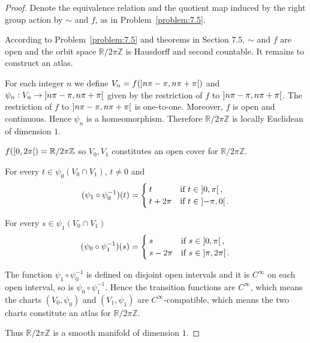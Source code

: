 \begin{proof}
    Denote the equivalence relation and the quotient map induced by the right group action by \( \sim \) and \( f \), as in Problem~\ref{problem:7.5}.

    According to Problem~\ref{problem:7.5} and theorems in Section 7.5, \( \sim \) and \( f \) are open and the orbit space \( \mathbb{R}/2\pi\mathbb{Z} \) is Hausdorff and second countable. It remains to construct an atlas.

    For each integer \(n\) we define \( V_{n} = f(\left\rbrack{n\pi - \pi, n\pi + \pi}\right\lbrack) \) and \( \psi_{n}: V_{n} \to \left\rbrack{n\pi - \pi, n\pi + \pi}\right\lbrack \) given by the restriction of \( f \) to \( \left\rbrack{n\pi - \pi, n\pi + \pi}\right\lbrack \). The restriction of \( f \) to \( \left\rbrack{n\pi - \pi, n\pi + \pi}\right\lbrack \) is one-to-one. Moreover, \( f \) is open and continuous. Hence \( \psi_{n} \) is a homeomorphism. Therefore \( \mathbb{R}/2\pi\mathbb{Z} \) is locally Euclidean of dimension \(1\).

    \( f(\left\lbrack{0, 2\pi}\right\lbrack) = \mathbb{R}/2\pi\mathbb{Z} \) so \( V_{0}, V_{1} \) constitutes an open cover for \( \mathbb{R}/2\pi\mathbb{Z} \).

    For every \( t \in \psi_{0}(V_{0} \cap V_{1}) \), \( t \ne 0 \) and
    \[
        (\psi_{1} \circ \psi_{0}^{-1})(t) = \begin{cases}
            t        & \text{if } t\in \left\rbrack{0, \pi}\right\lbrack,  \\
            t + 2\pi & \text{if } t\in \left\rbrack{-\pi, 0}\right\lbrack.
        \end{cases}
    \]

    For every \( s \in \psi_{1}(V_{0} \cap V_{1}) \)
    \[
        (\psi_{0} \circ \psi_{1}^{-1})(s) = \begin{cases}
            s        & \text{if } s\in \left\rbrack{0, \pi}\right\lbrack,    \\
            s - 2\pi & \text{if } s\in \left\rbrack{\pi, 2\pi}\right\lbrack.
        \end{cases}
    \]

    The function \( \psi_{1}\circ \psi_{0}^{-1} \) is defined on disjoint open intervals and it is \( C^{\infty} \) on each open interval, so is \( \psi_{0} \circ \psi_{1}^{-1} \). Hence the transition functions are \( C^{\infty} \), which means the charts \( (V_{0}, \psi_{0}) \) and \( (V_{1}, \psi_{1}) \) are \( C^{\infty} \)-compatible, which means the two charts constitute an atlas for \( \mathbb{R}/2\pi\mathbb{Z} \).

    Thus \( \mathbb{R}/2\pi\mathbb{Z} \) is a smooth manifold of dimension \(1\).
\end{proof}

